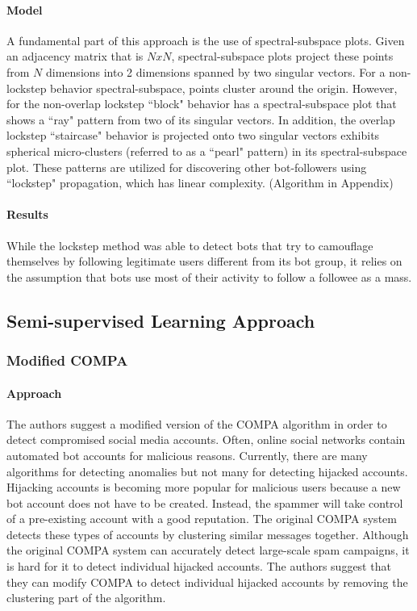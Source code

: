 \documentclass[11pt, oneside]{article}   	%
\begin{document}
\paragraph{Model}
\quad

\quad A fundamental part of this approach is the use of spectral-subspace plots.
Given an adjacency matrix that is $NxN$, spectral-subspace plots project these points from $N$ dimensions into 2 dimensions spanned by two singular vectors.
For a non-lockstep behavior spectral-subspace, points cluster around the origin.
However, for the non-overlap lockstep ``block" behavior has a spectral-subspace plot that shows a ``ray" pattern from two of its singular vectors.
In addition, the overlap lockstep ``staircase" behavior is projected onto two singular vectors exhibits spherical micro-clusters (referred to as a ``pearl" pattern) in its spectral-subspace plot.
These patterns are utilized for discovering other bot-followers using ``lockstep" propagation, which has linear complexity. (Algorithm in Appendix)

\paragraph{Results}
\quad

\quad While the lockstep method was able to detect bots that try to camouflage themselves by following legitimate users different from its bot group, it relies on the assumption that bots use most of their activity to follow a followee as a mass.

\subsection{Semi-supervised Learning Approach}
\subsubsection{Modified COMPA }

\paragraph*{Approach}
\quad

\quad The authors \cite{compa} suggest a modified version of the COMPA algorithm in order to detect compromised social media accounts.
Often, online social networks contain automated bot accounts for malicious reasons.
Currently, there are many algorithms for detecting anomalies but not many for detecting hijacked accounts.
Hijacking accounts is becoming more popular for malicious users because a new bot account does not have to be created.
Instead, the spammer will take control of a pre-existing account with a good reputation.
The original COMPA system detects these types of accounts by clustering similar messages together.
Although the original COMPA system can accurately detect large-scale spam campaigns, it is hard for it to detect individual hijacked accounts.
The authors suggest that they can modify COMPA to detect individual hijacked accounts by removing the clustering part of the algorithm.
\end{document}
